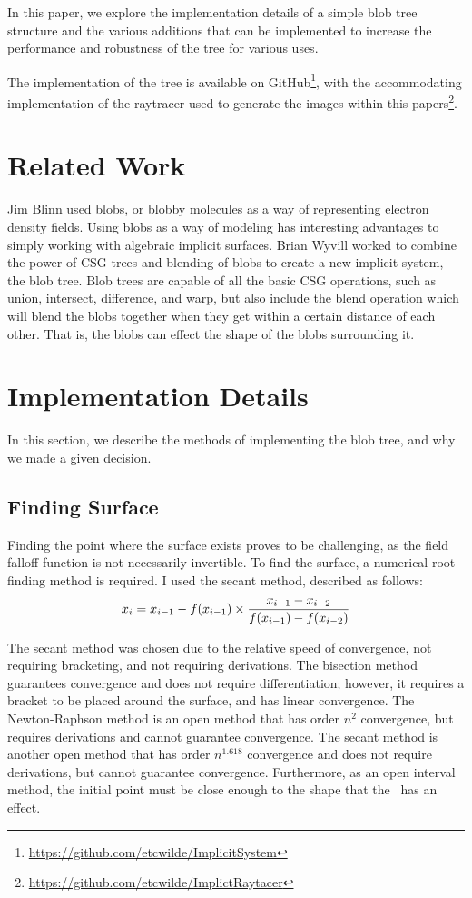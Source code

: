 \documentclass[conference]{acmsiggraph}
\begin{document}
In this paper, we explore the implementation details of a simple blob tree
structure and the various additions that can be implemented to increase the
performance and robustness of the tree for various uses.

The implementation of the tree is available on
GitHub\footnote{\url{https://github.com/etcwilde/ImplicitSystem}}, with the
accommodating implementation of the raytracer used to generate the images
within this papers\footnote{\url{https://github.com/etcwilde/ImplictRaytacer}}.

\section{Related Work}
Jim Blinn used blobs, or blobby molecules as a way of representing electron
density fields\cite{Blinn}. Using blobs as a way of modeling has interesting
advantages to simply working with algebraic implicit surfaces. Brian Wyvill
worked to combine the power of CSG trees and blending of blobs to create a new
implicit system, the blob tree. Blob trees are capable of all the basic CSG
operations, such as union, intersect, difference, and warp, but also include
the blend operation which will blend the blobs together when they get within a
certain distance of each other. That is, the blobs can effect the shape of the
blobs surrounding it.

\section{Implementation Details}
In this section, we describe the methods of implementing the blob tree, and why
we made a given decision.


\subsection{Finding Surface}
Finding the point where the surface exists proves to be challenging, as the
field falloff function is not necessarily invertible. To find the surface, a numerical
root-finding method is required. I used the secant method, described as
follows:
\begin{equation}
x_i = x_{i-1} - f(x_{i-1}) \times {x_{i-1} - x_{i-2} \over f(x_{i-1}) -
f(x_{i-2})}
\label{eq:SecantMethod}
\end{equation}

The secant method was chosen due to the relative speed of convergence, not
requiring bracketing, and not requiring derivations. The bisection method
guarantees convergence and does not require differentiation; however, it
requires a bracket to be placed around the surface, and has linear convergence. The
Newton-Raphson method is an open method that has order $n^2$ convergence, but
requires derivations and cannot guarantee convergence. The secant method is
another open method that has order $n^{1.618}$ convergence and does not require
derivations, but cannot guarantee convergence. Furthermore, as an open interval
method, the initial point must be close enough to the shape that the \fff\ has
an effect.
\end{document}
